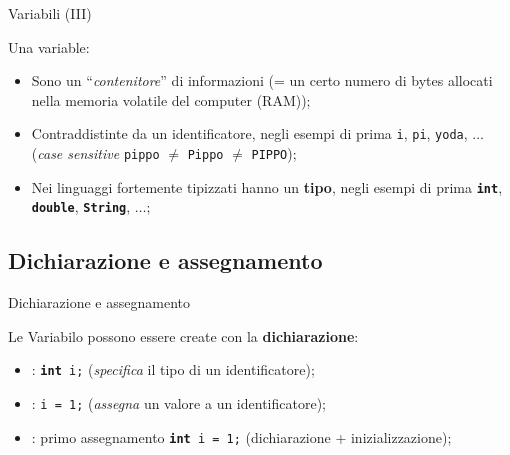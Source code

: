 \begin{frame}{Variabili (III)}

  Una variable:
  \begin{itemize}
    \item Sono un ``\emph{contenitore}'' di informazioni (= un certo numero di bytes allocati nella 
	  memoria volatile del computer (RAM));
    \item Contraddistinte da un identificatore, negli esempi di prima \texttt{i}, \texttt{pi}, 
	  \texttt{yoda}, $\dots$
	  (\emph{case sensitive} \texttt{pippo} $\neq$ \texttt{Pippo} $\neq$ \texttt{PIPPO}); 
    \item Nei linguaggi fortemente tipizzati hanno un \textbf{tipo}, negli esempi di prima 
	  \texttt{\textbf{int}}, \texttt{\textbf{double}}, \texttt{\textbf{String}}, $\dots$;
  \end{itemize}

\end{frame}

\subsection[Dichiarazione e assegnamento]{Dichiarazione e assegnamento}

\begin{frame}{Dichiarazione e assegnamento}

  Le Variabilo possono essere create con la \textbf{dichiarazione}:
  \begin{itemize}
    \item \textbf{}: \texttt{\textbf{int} i;} (\emph{specifica} il tipo di un identificatore);
    \item \textbf{}:  \texttt{i = 1;} (\emph{assegna} un valore a un identificatore);
    \item \textbf{}: primo assegnamento \texttt{\textbf{int} i = 1;} (dichiarazione + inizializzazione);
  \end{itemize}

\end{frame}
